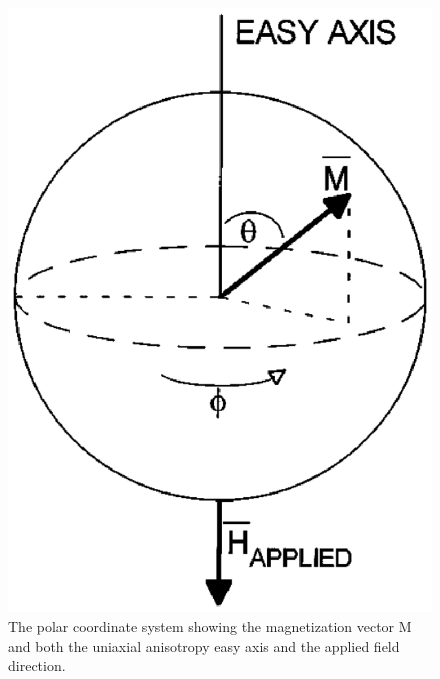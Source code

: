 {{			\begin{figure}[H]
				\begin{center}
					\includegraphics[scale=1]{me20b178_1.eps}
				\end{center}
				\caption{The polar coordinate system showing the magnetization vector M and both the uniaxial anisotropy easy axis and the applied field direction.}
				\label{fig:magnetic_precession} 
			\end{figure}

}}

